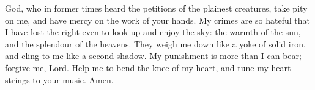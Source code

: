 God, who in former times heard the petitions of the plainest creatures, take pity on me, and have mercy on the work of your hands. My crimes are so hateful that I have lost the right even to look up and enjoy the sky: the warmth of the sun, and the splendour of the heavens. They weigh me down like a yoke of solid iron, and cling to me like a second shadow. My punishment is more than I can bear; forgive me, Lord. Help me to bend the knee of my heart, and tune my heart strings to your music. Amen.
